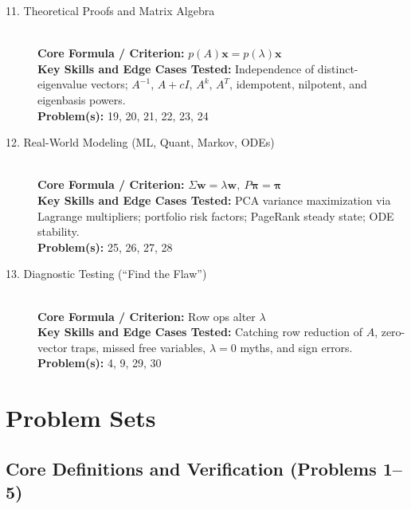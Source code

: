 \documentclass[11pt, letterpaper]{article}
\theoremstyle{definition}
\theoremstyle{remark}
\begin{document}
\begin{description}
    \item[11. Theoretical Proofs and Matrix Algebra] \hfill \\
    \textbf{Core Formula / Criterion:} $p(A)\mathbf{x} = p(\lambda)\mathbf{x}$ \\
    \textbf{Key Skills and Edge Cases Tested:} Independence of distinct-eigenvalue vectors; $A^{-1}$, $A+cI$, $A^k$, $A^T$, idempotent, nilpotent, and eigenbasis powers. \\
    \textbf{Problem(s):} 19, 20, 21, 22, 23, 24

    \item[12. Real-World Modeling (ML, Quant, Markov, ODEs)] \hfill \\
    \textbf{Core Formula / Criterion:} $\Sigma\mathbf{w} = \lambda\mathbf{w},\ P\boldsymbol{\pi} = \boldsymbol{\pi}$ \\
    \textbf{Key Skills and Edge Cases Tested:} PCA variance maximization via Lagrange multipliers; portfolio risk factors; PageRank steady state; ODE stability. \\
    \textbf{Problem(s):} 25, 26, 27, 28

    \item[13. Diagnostic Testing (``Find the Flaw'')] \hfill \\
    \textbf{Core Formula / Criterion:} Row ops alter $\lambda$ \\
    \textbf{Key Skills and Edge Cases Tested:} Catching row reduction of $A$, zero-vector traps, missed free variables, $\lambda = 0$ myths, and sign errors. \\
    \textbf{Problem(s):} 4, 9, 29, 30
\end{description}

\newpage

\section{Problem Sets}

\subsection{Core Definitions and Verification (Problems 1--5)}
\end{document}
